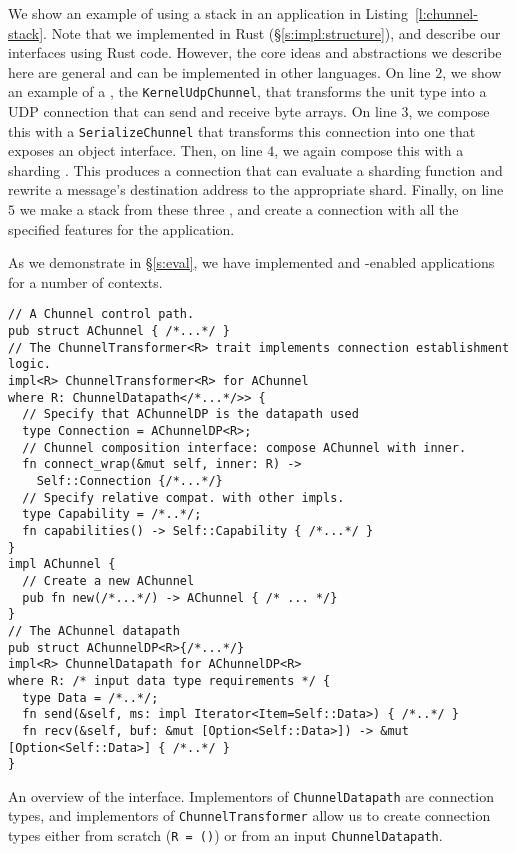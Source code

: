 We show an example of using a \tunnel stack in an application in Listing~\ref{l:chunnel-stack}.
Note that we implemented \name in Rust (\S\ref{s:impl:structure}), and describe our interfaces using Rust code. However, the core ideas and abstractions we describe here are general and can be implemented in other languages.
On line $2$, we show an example of a \tunnel, the \texttt{KernelUdpChunnel}, that transforms the unit type into a UDP connection that can send and receive byte arrays.
On line $3$, we compose this with a \texttt{SerializeChunnel} that transforms this connection into one that exposes an object interface.
Then, on line $4$, we again compose this \tunnel with a sharding \tunnel. This produces a connection that can evaluate a sharding function and rewrite a message's destination address to the appropriate shard.
Finally, on line $5$ we make a \tunnel stack from these three \tunnels, and create a connection with all the specified features for the application.

\begin{outline}
    \1 As we demonstrate in \S\ref{s:eval}, we have implemented \tunnels and \tunnel-enabled applications for a number of contexts. 
\end{outline}

\begin{listing}[t]
\begin{verbatim}
// A Chunnel control path.
pub struct AChunnel { /*...*/ }
// The ChunnelTransformer<R> trait implements connection establishment logic.
impl<R> ChunnelTransformer<R> for AChunnel
where R: ChunnelDatapath</*...*/>> {
  // Specify that AChunnelDP is the datapath used
  type Connection = AChunnelDP<R>;
  // Chunnel composition interface: compose AChunnel with inner.
  fn connect_wrap(&mut self, inner: R) -> 
    Self::Connection {/*...*/}
  // Specify relative compat. with other impls.
  type Capability = /*..*/;
  fn capabilities() -> Self::Capability { /*...*/ }
}
impl AChunnel {
  // Create a new AChunnel
  pub fn new(/*...*/) -> AChunnel { /* ... */}
}
// The AChunnel datapath
pub struct AChunnelDP<R>{/*...*/}
impl<R> ChunnelDatapath for AChunnelDP<R>
where R: /* input data type requirements */ {
  type Data = /*..*/;
  fn send(&self, ms: impl Iterator<Item=Self::Data>) { /*..*/ }
  fn recv(&self, buf: &mut [Option<Self::Data>]) -> &mut [Option<Self::Data>] { /*..*/ }
}
\end{verbatim}
\caption{An overview of the \tunnel interface. Implementors of \texttt{ChunnelDatapath} are connection types, and implementors of \texttt{ChunnelTransformer} allow us to create connection types either from scratch (\ie \texttt{R = ()}) or from an input \texttt{ChunnelDatapath}.}
\label{l:chunnel}
\end{listing}

